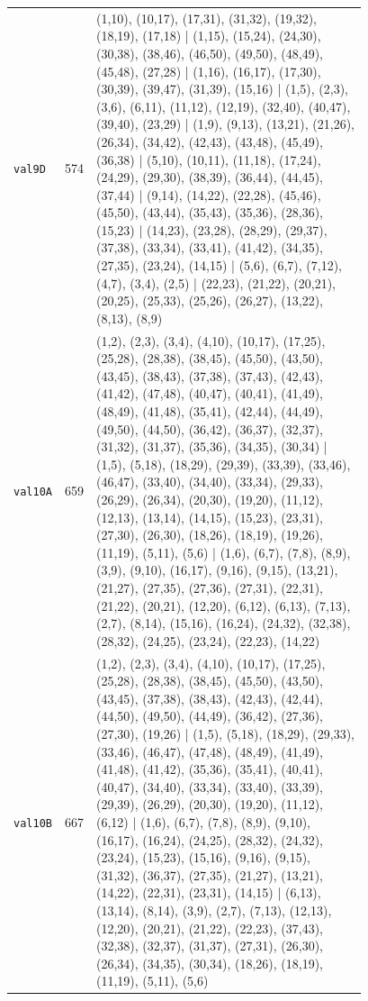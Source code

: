 \begin{landscape}
\begin{longtable}{lr>{\tiny\raggedright\arraybackslash}p{0.78\linewidth}}
\texttt{val9D} & 574 & (1,10), (10,17), (17,31), (31,32), (19,32), (18,19), (17,18) | (1,15), (15,24), (24,30), (30,38), (38,46), (46,50), (49,50), (48,49), (45,48), (27,28) | (1,16), (16,17), (17,30), (30,39), (39,47), (31,39), (15,16) | (1,5), (2,3), (3,6), (6,11), (11,12), (12,19), (32,40), (40,47), (39,40), (23,29) | (1,9), (9,13), (13,21), (21,26), (26,34), (34,42), (42,43), (43,48), (45,49), (36,38) | (5,10), (10,11), (11,18), (17,24), (24,29), (29,30), (38,39), (36,44), (44,45), (37,44) | (9,14), (14,22), (22,28), (45,46), (45,50), (43,44), (35,43), (35,36), (28,36), (15,23) | (14,23), (23,28), (28,29), (29,37), (37,38), (33,34), (33,41), (41,42), (34,35), (27,35), (23,24), (14,15) | (5,6), (6,7), (7,12), (4,7), (3,4), (2,5) | (22,23), (21,22), (20,21), (20,25), (25,33), (25,26), (26,27), (13,22), (8,13), (8,9) \\[2pt]
\texttt{val10A} & 659 & (1,2), (2,3), (3,4), (4,10), (10,17), (17,25), (25,28), (28,38), (38,45), (45,50), (43,50), (43,45), (38,43), (37,38), (37,43), (42,43), (41,42), (47,48), (40,47), (40,41), (41,49), (48,49), (41,48), (35,41), (42,44), (44,49), (49,50), (44,50), (36,42), (36,37), (32,37), (31,32), (31,37), (35,36), (34,35), (30,34) | (1,5), (5,18), (18,29), (29,39), (33,39), (33,46), (46,47), (33,40), (34,40), (33,34), (29,33), (26,29), (26,34), (20,30), (19,20), (11,12), (12,13), (13,14), (14,15), (15,23), (23,31), (27,30), (26,30), (18,26), (18,19), (19,26), (11,19), (5,11), (5,6) | (1,6), (6,7), (7,8), (8,9), (3,9), (9,10), (16,17), (9,16), (9,15), (13,21), (21,27), (27,35), (27,36), (27,31), (22,31), (21,22), (20,21), (12,20), (6,12), (6,13), (7,13), (2,7), (8,14), (15,16), (16,24), (24,32), (32,38), (28,32), (24,25), (23,24), (22,23), (14,22) \\[2pt]
\texttt{val10B} & 667 & (1,2), (2,3), (3,4), (4,10), (10,17), (17,25), (25,28), (28,38), (38,45), (45,50), (43,50), (43,45), (37,38), (38,43), (42,43), (42,44), (44,50), (49,50), (44,49), (36,42), (27,36), (27,30), (19,26) | (1,5), (5,18), (18,29), (29,33), (33,46), (46,47), (47,48), (48,49), (41,49), (41,48), (41,42), (35,36), (35,41), (40,41), (40,47), (34,40), (33,34), (33,40), (33,39), (29,39), (26,29), (20,30), (19,20), (11,12), (6,12) | (1,6), (6,7), (7,8), (8,9), (9,10), (16,17), (16,24), (24,25), (28,32), (24,32), (23,24), (15,23), (15,16), (9,16), (9,15), (31,32), (36,37), (27,35), (21,27), (13,21), (14,22), (22,31), (23,31), (14,15) | (6,13), (13,14), (8,14), (3,9), (2,7), (7,13), (12,13), (12,20), (20,21), (21,22), (22,23), (37,43), (32,38), (32,37), (31,37), (27,31), (26,30), (26,34), (34,35), (30,34), (18,26), (18,19), (11,19), (5,11), (5,6) \\[2pt]

\end{longtable}
\end{landscape}
